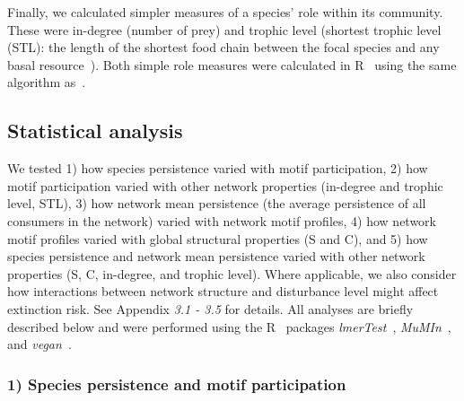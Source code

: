 \documentclass[12pt]{article}
\begin{document}
\begin{spacing}{2.0}
        Finally, we calculated simpler measures of a species' role within its community.
        These were in-degree (number of prey) and trophic level (shortest trophic level (STL): the length of the shortest food chain between the focal species and any basal resource~\citep{Williams2004}).
        Both simple role measures were calculated in R~\citep{R} using the same algorithm as~\citet{Eklof2013}.
        


	\subsection*{Statistical analysis} 

    	We tested 1) how species persistence varied with motif participation, 2) how motif participation varied with other network properties (in-degree and trophic level, STL), 3) how network mean persistence (the average persistence of all consumers in the network) varied with network motif profiles, 4) how network motif profiles varied with global structural properties (S and C), and 5) how species persistence and network mean persistence varied with other network properties (S, C, in-degree, and trophic level).
        Where applicable, we also consider how interactions between network structure and disturbance level might affect extinction risk.
    	See Appendix \emph{3.1 - 3.5} for details. 
    	All analyses are briefly described below and were performed using the R~\citep{R} packages \emph{lmerTest}~\citep{lmerTest}, \emph{MuMIn}~\citep{MuMIn}, and \emph{vegan}~\citep{vegan}.

        
        \subsubsection*{1) Species persistence and motif participation}


\end{spacing}
\end{document}
